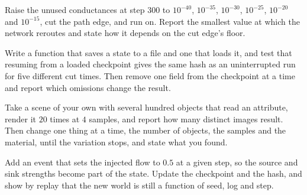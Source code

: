 \begin{exercise}
Raise the unused conductances at step $300$ to $10^{-40}$, $10^{-35}$, $10^{-30}$, $10^{-25}$, $10^{-20}$ and $10^{-15}$, cut the path edge, and run on. Report the smallest value at which the network reroutes and state how it depends on the cut edge's floor.
\end{exercise}

\begin{exercise}
Write a function that saves a state to a file and one that loads it, and test that resuming from a loaded checkpoint gives the same hash as an uninterrupted run for five different cut times. Then remove one field from the checkpoint at a time and report which omissions change the result.
\end{exercise}

\begin{exercise}
Take a scene of your own with several hundred objects that read an attribute, render it $20$ times at $4$ samples, and report how many distinct images result. Then change one thing at a time, the number of objects, the samples and the material, until the variation stops, and state what you found.
\end{exercise}

\begin{exercise}
Add an event that sets the injected flow to $0.5$ at a given step, so the source and sink strengths become part of the state. Update the checkpoint and the hash, and show by replay that the new world is still a function of seed, log and step.
\end{exercise}
